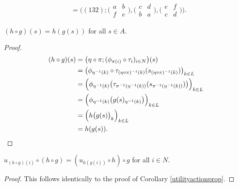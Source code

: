 \begin{example}
\begin{align*}
   				   &= \bigl((132) ; \bigl(\begin{smallmatrix} a & b \\ f & e \end{smallmatrix}\bigr), \bigl(\begin{smallmatrix} c & d \\ b & a \end{smallmatrix}\bigr), \bigl(\begin{smallmatrix} e & f \\ c & d \end{smallmatrix}\bigr)\bigr).
   		\end{align*}
   	\end{example}
        
	\begin{lemma} 
		$(h \circ g)(s) = h(g(s))$ for all $s \in A$.
		\begin{proof}
			\begin{align*}
				(h \circ g)(s) &= \bigl(\eta \circ \pi; (\phi_{\pi(i)} \circ \tau_i)_{i \in N}\bigr)(s) \\
				&= \bigl(\phi_{\eta^{-1}(k)} \circ \tau_{(\eta \circ \pi)^{-1}(k)}(s_{(\eta \circ \pi)^{-1}(k)})\bigr)_{k \in L} \\
				&= \Bigl(\phi_{\eta^{-1}(k)}\bigl(\tau_{\pi^{-1}(\eta^{-1}(k))}(s_{\pi^{-1}(\eta^{-1}(k))})\bigr)\Bigr)_{k \in L} \\
				&= \Bigl(\phi_{\eta^{-1}(k)}\bigl(g(s)_{\eta^{-1}(k)}\bigr)\Bigr)_{k \in L} \\
				&= \Bigl(h\bigl(g(s)\bigr)_k\Bigr)_{k \in L} \\
				&= h(g(s)).
			\end{align*}
		\end{proof}
	\end{lemma}
	
	\begin{corollary}
		$u_{(h \circ g)(i)} \circ (h \circ g) = (u_{h(g(i))} \circ h) \circ g$ for all $i \in N$.
		
		\begin{proof}
			This follows identically to the proof of Corollary \ref{utilityactionprop}.
		\end{proof}
	\end{corollary}
        
